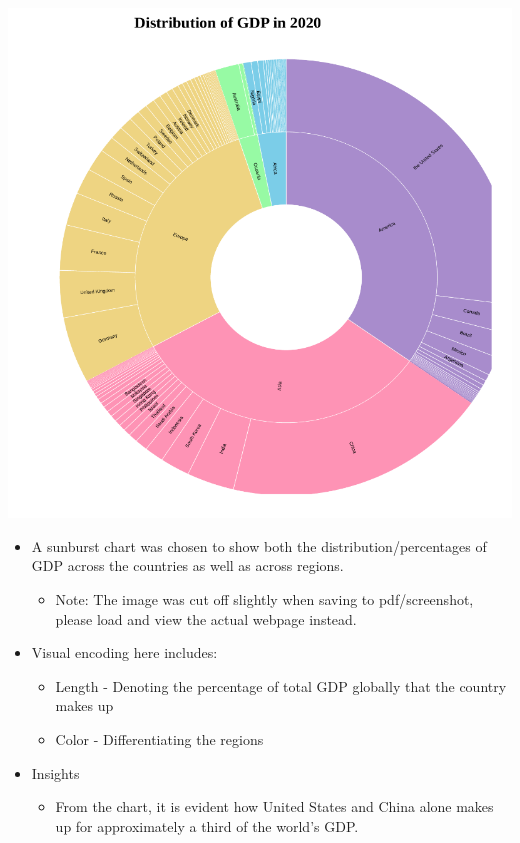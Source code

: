\documentclass[a4paper, 11pt]{article}
\begin{document}
\begin{center}
\includegraphics[width=.9\linewidth]{./charts/gdp_sunburst.png}
\end{center}

\begin{itemize}
\item A sunburst chart was chosen to show both the distribution/percentages of GDP across the countries as well as across regions.
\begin{itemize}
\item Note: The image was cut off slightly when saving to pdf/screenshot, please load and view the actual webpage instead.
\end{itemize}
\item Visual encoding here includes:
\begin{itemize}
\item Length - Denoting the percentage of total GDP globally that the country makes up
\item Color - Differentiating the regions
\end{itemize}
\item Insights
\begin{itemize}
\item From the chart, it is evident how United States and China alone makes up for approximately a third of the world's GDP.
\end{itemize}
\end{itemize}
\end{document}
